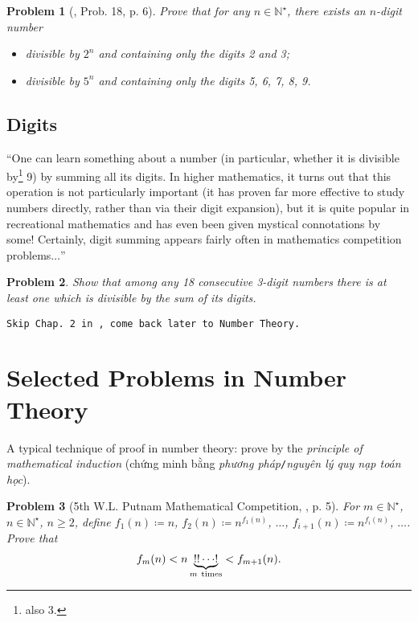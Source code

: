 \documentclass[oneside]{book}
\numberwithin{equation}{section}
\newtheorem{problem}{Problem}[section]
\begin{document}
\begin{problem}[\cite{Gelca_Andreescu2017}, Prob. 18, p. 6]
	Prove that for any $n\in\mathbb{N}^\star$, there exists an $n$-digit number
	\begin{itemize}
		\item[(a)] divisible by $2^n$ and containing only the digits 2 and 3;
		\item[(b)] divisible by $5^n$ and containing only the digits 5, 6, 7, 8, 9.
	\end{itemize}
\end{problem}

\subsection{Digits}
``One can learn something about a number (in particular, whether it is divisible by\footnote{also 3.} 9) by summing all its digits. In higher mathematics, it turns out that this operation is not particularly important (it has proven far more effective to study numbers directly, rather than
via their digit expansion), but it is quite popular in recreational mathematics and has even been given mystical connotations by some! Certainly, digit summing appears fairly often in mathematics competition problems$\ldots$''

\begin{problem}
	Show that among any 18 consecutive 3-digit numbers there is at least one which is divisible by the sum of its digits.
\end{problem}
\texttt{Skip Chap. 2 in \cite{Tao2006}, come back later to Number Theory.}

\section{Selected Problems in Number Theory}
A typical technique of proof in number theory: prove by the \textit{principle of mathematical induction} (chứng minh bằng \textit{phương pháp}\texttt{/}\textit{nguyên lý quy nạp toán học}).

\begin{problem}[5th W.L. Putnam Mathematical Competition, \cite{Gelca_Andreescu2017}, p. 5]
	For $m\in\mathbb{N}^\star$, $n\in\mathbb{N}^\star$, $n\ge 2$, define $f_1(n)\coloneqq n$, $f_2(n)\coloneqq n^{f_1(n)}$, $\ldots$, $f_{i+1}(n)\coloneqq n^{f_i(n)}$, $\ldots$. Prove that
	\begin{align*}
		f_m(n) < n\underbrace{!!\cdots!}_{m\ {\rm times}} < f_{m+1}(n).
	\end{align*}
\end{problem}
\end{document}
